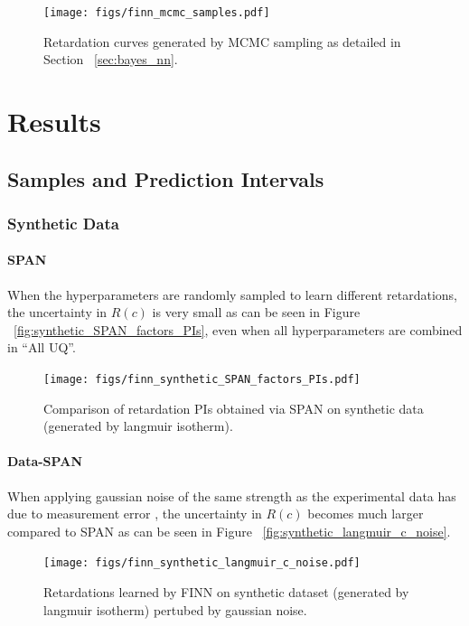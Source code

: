 \begin{figure}
    \centering
    \texttt{[image: figs/finn\_mcmc\_samples.pdf]}
    \caption{Retardation curves generated by MCMC sampling as detailed in Section ~\vref{sec:bayes_nn}.}
    \label{fig:mcmc_samples}
\end{figure}





\section{Results}
\subsection{Samples and Prediction Intervals}
\subsubsection{Synthetic Data}

\paragraph{SPAN}
When the hyperparameters are randomly sampled to learn different retardations, the uncertainty in $R(c)$ is very small as can be seen in Figure ~\vref{fig:synthetic_SPAN_factors_PIs}, even when all hyperparameters are combined in ``All UQ''.

\begin{figure}
    \centering
    \texttt{[image: figs/finn\_synthetic\_SPAN\_factors\_PIs.pdf]}
    \caption{Comparison of retardation PIs obtained via SPAN on synthetic data (generated by langmuir isotherm).}
    \label{fig:synthetic_SPAN_factors_PIs}
\end{figure}

\paragraph{Data-SPAN}
When applying gaussian noise of the same strength as the experimental data has due to measurement error \cite{nowak2016entropy}, the uncertainty in $R(c)$ becomes much larger compared to SPAN as can be seen in Figure ~\vref{fig:synthetic_langmuir_c_noise}.

\begin{figure}
    \centering
    \texttt{[image: figs/finn\_synthetic\_langmuir\_c\_noise.pdf]}
    \caption{Retardations learned by FINN on synthetic dataset (generated by langmuir isotherm) pertubed by gaussian noise.}
    \label{fig:synthetic_langmuir_c_noise}
\end{figure}



